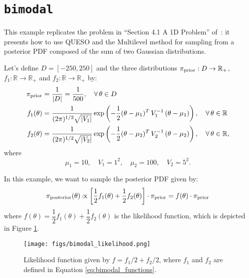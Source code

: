 \section{\texttt{bimodal}}\label{sec:example_bimodal}


This example replicates the problem in ``Section 4.1 A 1D Problem'' of~\cite{CheungPrudencio2012}: it presents how to use QUESO and the Multilevel method for sampling from a posterior PDF composed of the sum of two Gaussian distributions.

Let's define $D=[-250,250]$ and the three distributions $\pi_{\text{prior}}: D \rightarrow \mathbb{R}_+ $, $f_1: \mathbb{R} \rightarrow \mathbb{R}_+ $ and $f_2: \mathbb{R} \rightarrow \mathbb{R}_+$ by:
\begin{equation}
\begin{split}\label{eq:bimodal_functions}
\pi_{\text{prior}} &=  \dfrac{1}{|D|} = \dfrac{1}{500}, \quad \forall \,  \theta \in D \\
f_1(\theta) &= \dfrac{1}{(2\pi)^{1/2} \sqrt{|V_1|}} \exp \left(-\dfrac{1}{2}(\theta - \mu_1)^T \, V_1^{-1} \, (\theta - \mu_1) \right), \quad \forall \,  \theta \in \mathbb{R} \\
f_2(\theta) &= \dfrac{1}{(2\pi)^{1/2} \sqrt{|V_2|}} \exp \left(-\dfrac{1}{2}(\theta - \mu_2)^T \, V_2^{-1} \, (\theta - \mu_2) \right), \quad \forall \, \theta \in \mathbb{R},
\end{split}
\end{equation}
where
\begin{equation*}
\mu_1 = 10, \quad  V_1 = 1^2, \quad \mu_2 = 100, \quad V_2= 5^2.
\end{equation*}

In this example, we want to sample the posterior PDF given by:
\begin{equation}
\pi_{\text{posterior}}(\theta)  \propto \left[\dfrac{1}{2} f_1(\theta) + \dfrac{1}{2} f_2(\theta) \right] \cdot \pi_{\text{prior}} = f(\theta) \cdot \pi_{\text{prior}}
\end{equation}
where $f(\theta)= \dfrac{1}{2} f_1(\theta) + \dfrac{1}{2} f_2(\theta)$ is the likelihood function, which is depicted in Figure \ref{fig:bimodal:likelihood}.

\begin{figure}[htpb]
\centering
\texttt{[image: figs/bimodal\_likelihood.png]}
\vspace{-10pt}
\caption{Likelihood function given by $f=f_1/2+ f_2/2$, where $f_1$ and $f_2$ are defined in Equation \eqref{eq:bimodal_functions}.}
\label{fig:bimodal:likelihood}
\end{figure}


